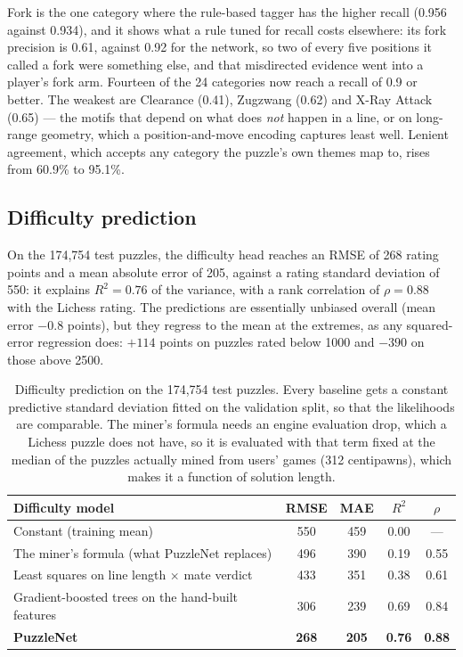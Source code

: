 Fork is the one category where the rule-based tagger has the higher recall (0.956 against 0.934), and
it shows what a rule tuned for recall costs elsewhere: its fork precision is 0.61, against 0.92 for the
network, so two of every five positions it called a fork were something else, and that misdirected
evidence went into a player's fork arm. Fourteen of the 24 categories now reach a recall of 0.9 or
better. The weakest are Clearance (0.41), Zugzwang (0.62) and X-Ray Attack (0.65) --- the motifs that
depend on what does \emph{not} happen in a line, or on long-range geometry, which a
position-and-move encoding captures least well. Lenient agreement, which accepts any category the
puzzle's own themes map to, rises from 60.9\% to 95.1\%.

\subsection{Difficulty prediction}\label{sec:nn-difficulty}

On the 174{,}754 test puzzles, the difficulty head reaches an RMSE of 268 rating points and a mean
absolute error of 205, against a rating standard deviation of 550: it explains $R^2 = 0.76$ of the
variance, with a rank correlation of $\rho = 0.88$ with the Lichess rating. The predictions are
essentially unbiased overall (mean error $-0.8$ points), but they regress to the mean at the extremes,
as any squared-error regression does: $+114$ points on puzzles rated below 1000 and $-390$ on those
above 2500.

\begin{table}[H]
\centering
\small
\caption{Difficulty prediction on the 174{,}754 test puzzles. Every baseline gets a constant
predictive standard deviation fitted on the validation split, so that the likelihoods are comparable.
The miner's formula needs an engine evaluation drop, which a Lichess puzzle does not have, so it is
evaluated with that term fixed at the median of the puzzles actually mined from users' games
(312 centipawns), which makes it a function of solution length.}\label{tab:nn-rating-baselines}
\begin{tabularx}{\linewidth}{Xcccc}
\toprule
\textbf{Difficulty model} & \textbf{RMSE} & \textbf{MAE} & \textbf{$R^2$} & \textbf{$\rho$} \\
\midrule
Constant (training mean)                          & 550 & 459 & 0.00 & --- \\
The miner's formula (what PuzzleNet replaces)     & 496 & 390 & 0.19 & 0.55 \\
Least squares on line length $\times$ mate verdict & 433 & 351 & 0.38 & 0.61 \\
Gradient-boosted trees on the hand-built features & 306 & 239 & 0.69 & 0.84 \\
\textbf{PuzzleNet}                                & \textbf{268} & \textbf{205} & \textbf{0.76} & \textbf{0.88} \\
\bottomrule
\end{tabularx}
\end{table}

